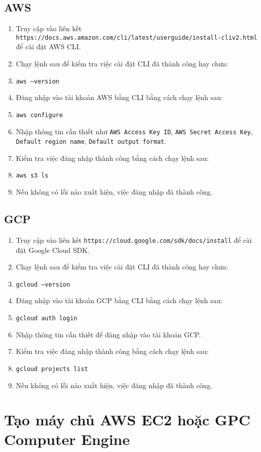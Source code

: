 \subsection{AWS}
\begin{enumerate}
\item Truy cập vào liên kết \texttt{https://docs.aws.amazon.com/cli/latest/userguide/install-cliv2.html} để cài đặt AWS CLI.
\item Chạy lệnh sau để kiểm tra việc cài đặt CLI đã thành công hay chưa:
\item \texttt{aws --version}
\item Đăng nhập vào tài khoản AWS bằng CLI bằng cách chạy lệnh sau:
\item \texttt{aws configure}
\item Nhập thông tin cần thiết như \texttt{AWS Access Key ID}, \texttt{AWS Secret Access Key}, \texttt{Default region name}, \texttt{Default output format}.
\item Kiểm tra việc đăng nhập thành công bằng cách chạy lệnh sau:
\item \texttt{aws s3 ls}
\item Nếu không có lỗi nào xuất hiện, việc đăng nhập đã thành công.
\end{enumerate}

\subsection{GCP}
\begin{enumerate}
\item Truy cập vào liên kết \texttt{https://cloud.google.com/sdk/docs/install} để cài đặt Google Cloud SDK.
\item Chạy lệnh sau để kiểm tra việc cài đặt CLI đã thành công hay chưa:
\item \texttt{gcloud --version}
\item Đăng nhập vào tài khoản GCP bằng CLI bằng cách chạy lệnh sau:
\item \texttt{gcloud auth login}
\item Nhập thông tin cần thiết để đăng nhập vào tài khoản GCP.
\item Kiểm tra việc đăng nhập thành công bằng cách chạy lệnh sau:
\item \texttt{gcloud projects list}
\item Nếu không có lỗi nào xuất hiện, việc đăng nhập đã thành công.
\end{enumerate}

\section{Tạo máy chủ AWS EC2 hoặc GPC Computer Engine}
